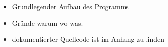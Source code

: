 
\begin{itemize}
\item Grundlegender Aufbau des Programms
\item Gründe warum wo was.
\item dokumentierter Quellcode ist im Anhang zu finden
\end{itemize}

\newpage

